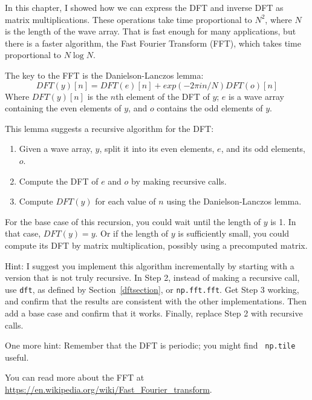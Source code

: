 \documentclass[12pt]{book}
\begin{document}
\begin{exercise}
In this chapter, I showed how we can express the DFT and inverse DFT
as matrix multiplications.  These operations take time proportional to
$N^2$, where $N$ is the length of the wave array.  That is fast enough
for many applications, but there is a faster
algorithm, the Fast Fourier Transform (FFT), which takes time
proportional to $N \log N$.

The key to the FFT is the Danielson-Lanczos lemma:
%
\[ DFT(y)[n] = DFT(e)[n] + exp(-2 \pi i n / N) DFT(o)[n] \]
%
Where $ DFT(y)[n]$ is the $n$th element of the DFT of $y$; $e$ is a
wave array containing the even elements of $y$, and $o$ contains the
odd elements of $y$.

This lemma suggests a recursive algorithm for the DFT:

\begin{enumerate}

\item Given a wave array, $y$, split it into its even elements, $e$,
  and its odd elements, $o$.

\item Compute the DFT of $e$ and $o$ by making recursive calls.

\item Compute $DFT(y)$ for each value of $n$ using the
  Danielson-Lanczos lemma.

\end{enumerate}

For the base case of this recursion, you could wait until the length
of $y$ is 1.  In that case, $DFT(y) = y$.  Or if the length of $y$
is sufficiently small, you could compute its DFT by matrix multiplication,
possibly using a precomputed matrix.

Hint: I suggest you implement this algorithm incrementally by starting
with a version that is not truly recursive.  In Step 2, instead of
making a recursive call, use {\tt dft}, as defined by
Section~\ref{dftsection}, or {\tt np.fft.fft}.  Get Step 3 working,
and confirm that the results are consistent with the other
implementations.  Then add a base case and confirm that it works.
Finally, replace Step 2 with recursive calls.

One more hint: Remember that the DFT is periodic; you might find {\tt
  np.tile} useful.

You can read more about the FFT at
\url{https://en.wikipedia.org/wiki/Fast_Fourier_transform}.

\end{exercise}
\end{document}
